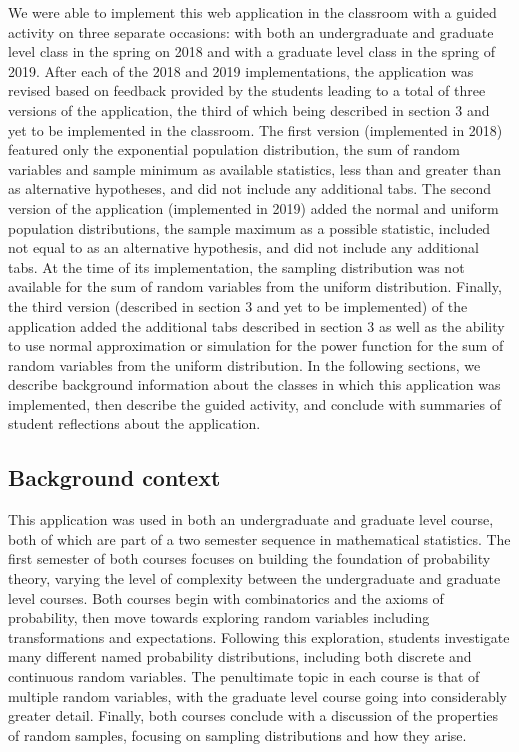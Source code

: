 \documentclass{TISE}
\begin{document}
We were able to implement this web application in the classroom with a guided activity on three separate occasions: with both an undergraduate and graduate level class in the spring on 2018 and with a graduate level class in the spring of 2019. After each of the 2018 and 2019 implementations, the application was revised based on feedback provided by the students leading to a total of three versions of the application, the third of which being described in section 3 and yet to be implemented in the classroom. The first version (implemented in 2018) featured only the exponential population distribution, the sum of random variables and sample minimum as available statistics, less than and greater than as alternative hypotheses, and did not include any additional tabs. The second version of the application (implemented in 2019) added the normal and uniform population distributions, the sample maximum as a possible statistic, included not equal to as an alternative hypothesis, and did not include any additional tabs. At the time of its implementation, the sampling distribution was not available for the sum of random variables from the uniform distribution. Finally, the third version (described in section 3 and yet to be implemented) of the application added the additional tabs described in section 3 as well as the ability to use normal approximation or simulation for the power function for the sum of random variables from the uniform distribution. In the following sections, we describe background information about the classes in which this application was implemented, then describe the guided activity, and conclude with summaries of student reflections about the application. 

\subsection{Background context}

This application was used in both an undergraduate and graduate level course, both of which are part of a two semester sequence in mathematical statistics. The first semester of both courses focuses on building the foundation of probability theory, varying the level of complexity between the undergraduate and graduate level courses. Both courses begin with combinatorics and the axioms of probability, then move towards exploring random variables including transformations and expectations. Following this exploration, students investigate many different named probability distributions, including both discrete and continuous random variables. The penultimate topic in each course is that of multiple random variables, with the graduate level course going into considerably greater detail. Finally, both courses conclude with a discussion of the properties of random samples, focusing on sampling distributions and how they arise. 
\end{document}
